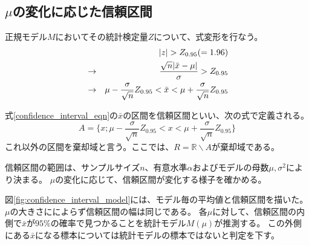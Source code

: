 
\fi


\subsection{$\mu$の変化に応じた信頼区間}
正規モデル$M$においてその統計検定量$Z$について、式変形を行なう。
\begin{eqnarray}
    & &|z| > Z_{0.95}( = 1.96 ) \notag \\
    &\rightarrow& \frac{\sqrt{n}|\bar{x}-\mu|}{\sigma} > Z_{0.95} \notag\\
    &\rightarrow& \mu-\frac{\sigma}{\sqrt{n}}Z_{0.95} < \bar{x} < \mu+\frac{\sigma}{\sqrt{n}}Z_{0.95} \label{confidence_interval_eqn}
\end{eqnarray}
\begin{defi}
式\eqref{confidence_interval_eqn}の$\bar{x}$の区間を信頼区間といい、次の式で定義される。
\begin{equation*}
    A=\{x;\mu-\frac{\sigma}{\sqrt{n}}Z_{0.95} < x < \mu+\frac{\sigma}{\sqrt{n}}Z_{0.95} \}
\end{equation*}
これ以外の区間を棄却域と言う。ここでは、$R=\mathbb{R}\backslash A$が棄却域である。
\end{defi}
信頼区間の範囲は、サンプルサイズ$n$、有意水準$\alpha$およびモデルの母数$\mu,\sigma^2$により決まる。
$\mu$の変化に応じて、信頼区間が変化する様子を確かめる。

図\ref{fig:confidence_interval_model}には、モデル毎の平均値と信頼区間を描いた。$\mu$の大きさにによらず信頼区間の幅は同じである。
各$\mu$に対して、信頼区間の内側で$\bar{x}$が$95\%$の確率で見つかることを統計モデル$M(\mu)$が推測する。
この外側にある$\bar{x}$になる標本については統計モデルの標本ではないと判定を下す。

